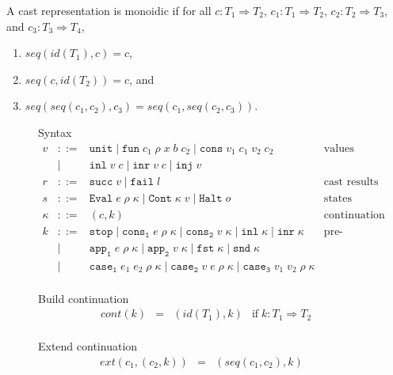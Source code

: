 \documentclass[acmsmall,review,anonymous]{acmart}\settopmatter{printfolios=true,printccs=false,printacmref=false}
\newcommand{\stxrule}[3]{#1 & ::= & #3 & \text{#2}\\}
\newcommand{\stxrulecont}[1]{& | & #1 & \\}
\newcommand{\funrule}[3]{#1 &=& #2 & #3\\}
\newcommand{\sOOinspect}[3]{\mathtt{Eval} \; #1 \; #2 \; #3}
\newcommand{\sOOreturn}[2]{\mathtt{Cont} \; #2 \; #1}
\newcommand{\sOOhalt}[1]{\mathtt{Halt} \; #1}
\newcommand{\rOOsucc}[1]{\mathtt{succ}\;#1}
\newcommand{\rOOfail}[1]{\mathtt{fail}\;#1}
\newcommand{\hcvOOinj}[2]{\mathtt{inj} \; #2}
\newcommand{\hcvOOfun}[5]{\mathtt{fun} \; #1 \; #2 \; #3 \; #4 \; #5}
\newcommand{\hcvOOtt}[0]{\mathtt{unit}}
\newcommand{\hcvOOcons}[4]{\mathtt{cons}\;#1\;#2\;#3\;#4}
\newcommand{\hcvOOinl}[2]{\mathtt{inl}\;#1\;#2}
\newcommand{\hcvOOinr}[2]{\mathtt{inr}\;#1\;#2}
\newcommand{\hckOOmt}[0]{\mathtt{stop}}
\newcommand{\sidecond}[1]{\text{if}\;#1}
\begin{document}
\begin{definition}
	A cast representation is monoidic if 
	for all $c : T_1 \Longrightarrow T_2$,
	$c_1 : T_1 \Longrightarrow T_2$,
	$c_2 : T_2 \Longrightarrow T_3$, and
	$c_3 : T_3 \Longrightarrow T_4$,
	\begin{enumerate}
		\item $seq(id(T_1),c) = c$,
		\item $seq(c,id(T_2)) = c$, and
		\item $seq(seq(c_1, c_2), c_3) = seq(c_1, seq(c_2, c_3))$.
	\end{enumerate}
\end{definition}

\begin{figure}
	Syntax
	\[
	\begin{array}{rclr}
	
	\stxrule{v}{values}{
		\hcvOOtt \mid
		\hcvOOfun{c_1}{\rho}{x}{b}{c_2} \mid
		\hcvOOcons{v_1}{c_1}{v_2}{c_2}
	}
	\stxrulecont{
		\hcvOOinl{v}{c} \mid
		\hcvOOinr{v}{c} \mid
		\hcvOOinj{P}{v}
	}
	\stxrule{r}{cast results}{
		\rOOsucc{v} \mid
		\rOOfail{l}
	}
	\stxrule{s}{states}{
		\sOOinspect{e}{\rho}{\kappa} \mid{}
		\sOOreturn{v}{\kappa} \mid{}
		\sOOhalt{o}
	}
	\stxrule{\kappa}{continuation}{
		(c,k)
	}
	\stxrule{k}{pre-continuations}{
		\hckOOmt \mid{}
		\mathtt{cons_1} \; e \; \rho \; \kappa \mid{}
		\mathtt{cons_2} \; v \; \kappa \mid{}
		\mathtt{inl} \; \kappa \mid{}
		\mathtt{inr} \; \kappa
	}
	\stxrulecont{
		\mathtt{app_1} \; e \; \rho \; \kappa \mid{}
		\mathtt{app_2} \; v \; \kappa \mid{}
		\mathtt{fst} \; \kappa \mid{}
		\mathtt{snd} \; \kappa
	}
	\stxrulecont{
		\mathtt{case_1} \; e_1 \; e_2 \; \rho \; \kappa \mid
		\mathtt{case_2} \; v   \; e   \; \rho \; \kappa \mid{}
		\mathtt{case_3} \; v_1 \; v_2 \; \rho \; \kappa
	}
	\end{array}
	\]
	
	Build continuation 
	\[
	\begin{array}{rclc}
	\funrule{cont(k)}{(id(T_1),k)}{
		\sidecond{k : T_1 \Longrightarrow T_2}}
	\end{array}
	\]
	
	Extend continuation 
	\[
	\begin{array}{rclc}
	\funrule{ext(c_1,(c_2,k))}{(seq(c_1,c_2),k)}{}
	\end{array}
	\]
	

\end{figure}
\end{document}
